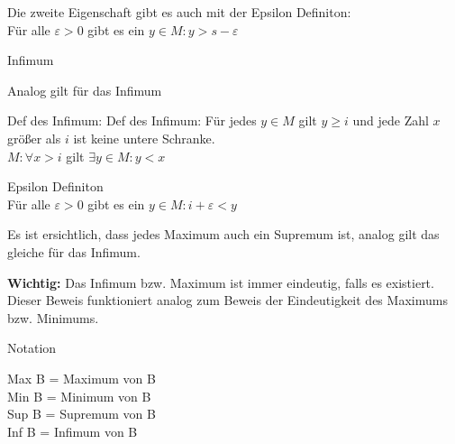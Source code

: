 \documentclass[headsepline,12pt,a4paper]{scrartcl}
\begin{document}
\item Die zweite Eigenschaft gibt es auch mit der Epsilon Definiton: \\
Für alle $ \varepsilon > 0 $ gibt es ein $ y \in M : y > s - \varepsilon $

\newpage
 

\begin{center}
\item[Infimum]
\end{center}
\item Analog gilt für das Infimum
\item Def des Infimum: Def des Infimum:
Für jedes $ y \in M $ gilt $ y \geq i $
und jede Zahl $x$ größer als $i$ ist keine untere Schranke. \\
$ M: \forall x > i $ gilt $ \exists y \in M : y < x $ \\
\item Epsilon Definiton \\
Für alle $ \varepsilon > 0 $ gibt es ein $ y \in M : i+ \varepsilon < y $ \\

\item Es ist ersichtlich, dass jedes Maximum auch ein Supremum ist, analog gilt das gleiche für das Infimum.
\item \textbf{Wichtig:} Das Infimum bzw. Maximum ist immer eindeutig, falls es existiert. Dieser Beweis funktioniert analog zum Beweis der Eindeutigkeit des Maximums bzw. Minimums.

\begin{center}
\item[Notation]
\end{center}
\item Max B = Maximum von B \\
Min B = Minimum von B \\
Sup B = Supremum von B \\
Inf B = Infimum von B \\

\newpage
\end{document}

